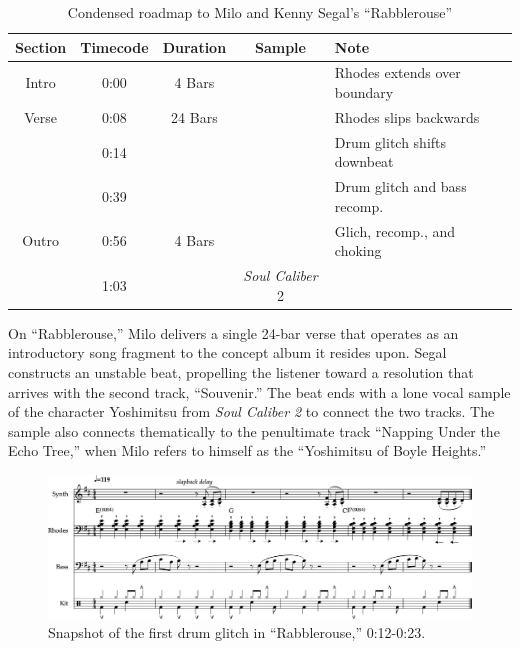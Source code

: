 \begin{table}[ht]
    \centering
        \begin{tabular}{|c|c|c|c|l|}
             \hline
            Section & Timecode & Duration & Sample                  & Note \\ \hline
            Intro   & 0:00     & 4 Bars   &                         & Rhodes extends over boundary \\ \hline
            Verse   & 0:08     & 24 Bars  &                         & Rhodes slips backwards \\ \hline
                    & 0:14     &          &                         & Drum glitch shifts downbeat \\ \hline
                    & 0:39     &          &                         & Drum glitch and bass recomp. \\ \hline
            Outro   & 0:56     & 4 Bars   &                         & Glich, recomp., and choking \\ \hline
                    & 1:03     &          & \textit{Soul Caliber} 2 & \\ \hline
        \end{tabular}
    \caption{Condensed roadmap to Milo and Kenny Segal's ``Rabblerouse''}
    \label{tab:rabblerouse}
\end{table}

On ``Rabblerouse,'' Milo delivers a single 24-bar verse that operates as an introductory song fragment to the concept album it resides upon. Segal constructs an unstable beat, propelling the listener toward a resolution that arrives with the second track, ``Souvenir.'' The beat ends with a lone vocal sample of the character Yoshimitsu from \textit{Soul Caliber 2} to connect the two tracks. The sample also connects thematically to the penultimate track ``Napping Under the Echo Tree,'' when Milo refers to himself as the ``Yoshimitsu of Boyle Heights.''

    \begin{figure}[ht]
        \centering
        \includegraphics[width=\textwidth]{images/figures/chp 02/012023rabblefirstglitch.pdf}
        \caption{Snapshot of the first drum glitch in ``Rabblerouse,'' 0:12-0:23.}
        \label{fig:rabblefirstglitch}
    \end{figure}

